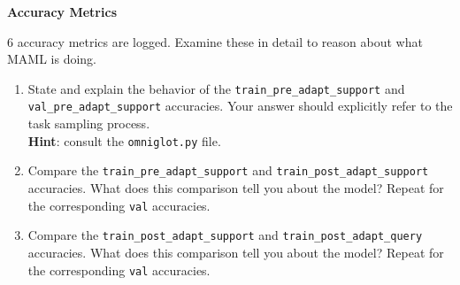 \item {} {\bf Accuracy Metrics}

6 accuracy metrics are logged. Examine these in detail to reason about what MAML is doing.
\begin{enumerate}[label=(\roman*)]
    \item State and explain the behavior of the \texttt{train\_pre\_adapt\_support} and \texttt{val\_pre\_adapt\_support} accuracies. Your answer should explicitly refer to the task sampling process. \\ \textbf{Hint}: consult the \texttt{omniglot.py} file.

    \item Compare the \texttt{train\_pre\_adapt\_support} and \texttt{train\_post\_adapt\_support} accuracies. What does this comparison tell you about the model? Repeat for the corresponding \texttt{val} accuracies.
    
    \item Compare the \texttt{train\_post\_adapt\_support} and \texttt{train\_post\_adapt\_query} accuracies. What does this comparison tell you about the model? Repeat for the corresponding \texttt{val} accuracies.
\end{enumerate}